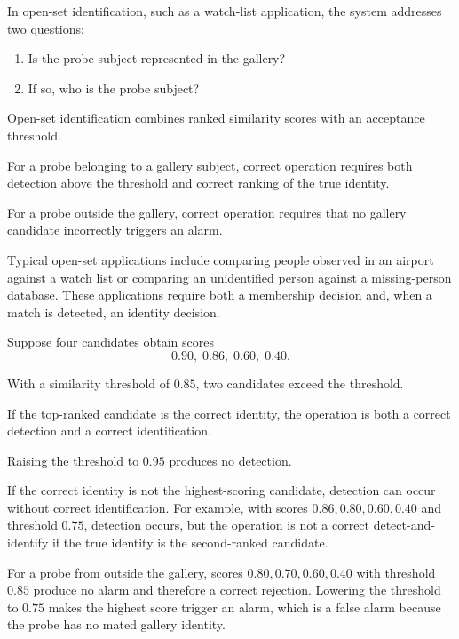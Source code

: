 \documentclass[11pt,a4paper,oneside]{report}
\begin{document}
In open-set identification, such as a watch-list application,
the system addresses two questions:

\begin{enumerate}
    \item Is the probe subject represented in the gallery?

    \item If so, who is the probe subject?
\end{enumerate}

Open-set identification combines ranked similarity scores with an acceptance threshold.

For a probe belonging to a gallery subject, correct operation requires
both detection above the threshold and correct ranking of the true
identity.

For a probe outside the gallery, correct operation requires that no
gallery candidate incorrectly triggers an alarm.

Typical open-set applications include comparing people observed in an airport
against a watch list or comparing an unidentified person against a missing-person
database. These applications require both a membership decision and, when a
match is detected, an identity decision.

\begin{examplebox}

Suppose four candidates obtain scores
\[
0.90,\;0.86,\;0.60,\;0.40.
\]

With a similarity threshold of \(0.85\),
two candidates exceed the threshold.

If the top-ranked candidate is the correct identity,
the operation is both a correct detection and a correct identification.

Raising the threshold to \(0.95\) produces no detection.

If the correct identity is not the highest-scoring candidate,
detection can occur without correct identification. For example, with scores
\(0.86,0.80,0.60,0.40\) and threshold \(0.75\), detection occurs, but the
operation is not a correct detect-and-identify if the true identity is the
second-ranked candidate.

For a probe from outside the gallery, scores
\(0.80,0.70,0.60,0.40\) with threshold \(0.85\) produce no alarm and
therefore a correct rejection. Lowering the threshold to \(0.75\) makes the
highest score trigger an alarm, which is a false alarm because the probe has
no mated gallery identity.

\end{examplebox}
\end{document}
